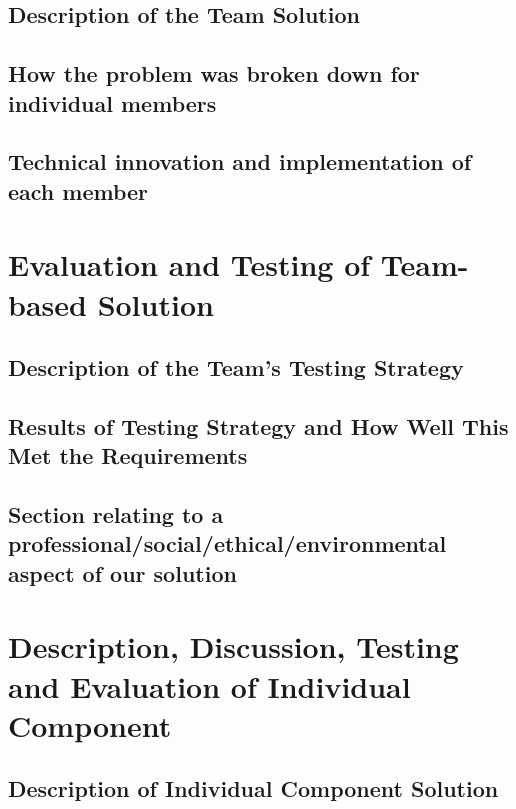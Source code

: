 \documentclass[a4paper]{report}
\begin{document}
\section{Description of the Team Solution}
\section{How the problem was broken down for individual members}
\section{Technical innovation and implementation of each member}

\chapter{Evaluation and Testing of Team-based Solution} 
\section{Description of the Team's Testing Strategy}
\section{Results of Testing Strategy and How Well This Met the Requirements}
\section{Section relating to a professional/social/ethical/environmental 
        aspect of our solution} %

\chapter{Description, Discussion, Testing and Evaluation of 
            Individual Component}
\section{Description of Individual Component Solution}
\end{document}
